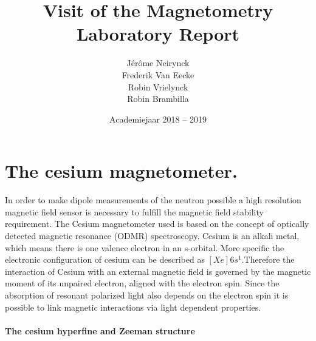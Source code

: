 \documentclass[a4paper,kul]{kulakarticle} %
\date{Academiejaar 2018 -- 2019}
\title{Visit of the Magnetometry Laboratory
	Report}
\author{Jérôme Neirynck\\ Frederik Van Eecke\\ Robin Vrielynck\\ Robin Brambilla}
\begin{document}
\maketitle


\section{The cesium magnetometer.}
In order to make dipole measurements of the neutron possible a high resolution magnetic field sensor is necessary to fulfill the magnetic field stability requirement. The Cesium magnetometer used is based on the concept of optically detected magnetic resonance (ODMR) spectroscopy. Cesium is an alkali metal, which means there is one valence electron in an s-orbital. More specific the electronic configuration of cesium can be described as $[Xe]6s^{1}$.Therefore the interaction of Cesium with an external magnetic field is governed by the magnetic moment of its unpaired electron, aligned with the electron spin. Since the absorption of resonant polarized light also depends on the electron spin it is possible to link magnetic interactions via light dependent properties.\\ 

\paragraph{The cesium hyperfine and Zeeman structure}
\end{document}

